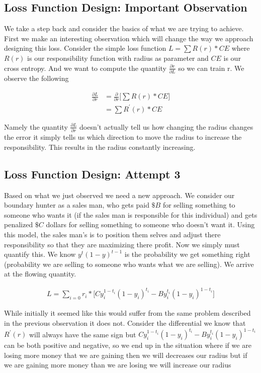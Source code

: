 \documentclass{article}
\begin{document}
\subsection{Loss Function Design: Important Observation}
We take a step back and consider the basics of what we are trying to achieve. First we make an interesting observation which will change the way we approach designing this loss. Consider the simple loss function $L =\sum R(r) * CE$ where $R(r)$ is our responsibility function with radius as parameter and $CE$ is our cross entropy. And we want to compute the quantity $\frac{\partial r}{\partial L}$ so we can train r. We observe the following

\begin{align*}
\frac{\partial L}{\partial r} &= \frac{\partial}{\partial r} \big[ \sum R(r) * CE \big] \\
&= \sum R^{'} (r) * CE
\end{align*} 

Namely the quantity $\frac{\partial L}{\partial r}$ doesn't actually tell us how changing the radius changes the error it simply tells us which direction to move the radius to increase the responsibility. This results in the radius constantly increasing.\\

\subsection{Loss Function Design: Attempt 3}
Based on what we just observed we need a new approach. We consider our boundary hunter as a sales man, who gets paid $\$B$ for selling something to someone who wants it (if the sales man is responsible for this individual) and gets penalized $\$C$ dollars for selling something to someone who doesn't want it. Using this model, the sales man's is to position them selves and adjust there responsibility so that they are maximizing there profit. Now we simply must quantify this. We know $y^t(1-y)^{t-1}$ is the probability we get something right (probability we are selling to someone who wants what we are selling). We arrive at the flowing quantity.

\begin{align}
L = \sum_{i=0} r_i * \big[Cy_i^{1-t_i}(1-y_i)^{t_i} - By_i^{t_i}(1-y_i)^{1-t_i} \big] 
\end{align}

While initially it seemed like this would suffer from the same problem described in the previous observation it does not. Consider the differential we know that $R^{'}(r)$ will always have the same sign but $Cy_i^{1-t_i}(1-y_i)^{t_i} - By_i^{t_i}(1-y_i)^{1-t_i} $ can be both positive and negative, so we end up in the situation where if we are losing more money that we are gaining then we will decreases our radius but if we are gaining more money than we are losing we will increase our radius
\end{document}
